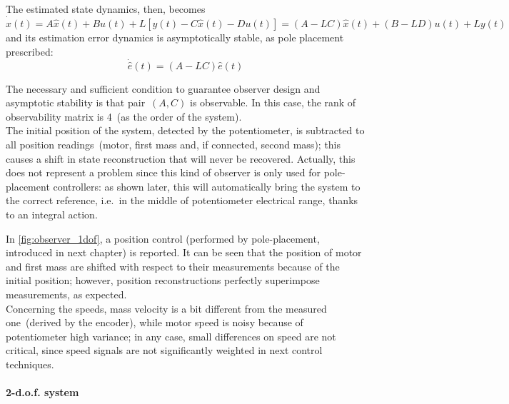 The estimated state dynamics, then, becomes
\begin{equation}
	\dot{\hat{x}}(t) = A\hat{x}(t) + Bu(t) + L [y(t) - C\hat{x}(t) - Du(t)] = (A-LC)\hat{x}(t) + (B-LD)u(t) + Ly(t)
	\label{eqn:est_state_dyn}
\end{equation}
and its estimation error dynamics is asymptotically stable, as pole placement prescribed:
\begin{equation}
	\dot{\hat{e}} (t) = (A-LC) \hat{e} (t)
\end{equation}

The necessary and sufficient condition to guarantee observer design and asymptotic stability is that pair~$(A,C)$ is observable. In this case, the rank of observability matrix is 4~(as the order of the system). \\

The initial position of the system, detected by the potentiometer, is subtracted to all position readings~(motor, first mass and, if connected, second mass); this causes a shift in state reconstruction that will never be recovered. Actually, this does not represent a problem since this kind of observer is only used for pole-placement controllers: as shown later, this will automatically bring the system to the correct reference, i.e.\ in the middle of potentiometer electrical range, thanks to an integral action.

In \cref{fig:observer_1dof}, a position control (performed by pole-placement, introduced in next chapter) is reported. It can be seen that the position of motor and first mass are shifted with respect to their measurements because of the initial position; however, position reconstructions perfectly superimpose measurements, as expected.\\
Concerning the speeds, mass velocity is a bit different from the measured one~(derived by the encoder), while motor speed is noisy because of potentiometer high variance; in any case, small differences on speed are not critical, since speed signals are not significantly weighted in next control techniques.

\paragraph{2-d.o.f. system}

